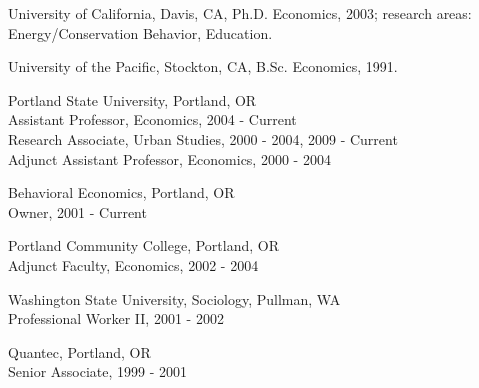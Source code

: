 \documentclass[Computer Science]{vita}
\begin{document}


  

\begin{vita}

  \begin{Degrees}
  \item University of California, Davis, CA, Ph.D. Economics, 2003;
    research areas: Energy/Conservation Behavior, Education.

  \item University of the Pacific, Stockton, CA, B.Sc. Economics,
    1991.
  \end{Degrees}

  \begin{Experience}
	
  \item Portland State University,  Portland, OR\\
    Assistant Professor, Economics, 2004 - Current\\
    Research Associate, Urban Studies, 2000 - 2004, 2009 - Current\\
    Adjunct Assistant Professor, Economics, 2000 - 2004
	
  \item Behavioral Economics, Portland, OR\\
    Owner, 2001 - Current
		
  \item Portland Community College, Portland, OR\\
    Adjunct Faculty, Economics, 2002 - 2004
	
  \item Washington State University, Sociology, Pullman, WA\\
    Professional Worker II, 2001 - 2002
	
  \item Quantec, Portland, OR\\
    Senior Associate, 1999 - 2001
	

\end{Experience}
\end{vita}
\end{document}
